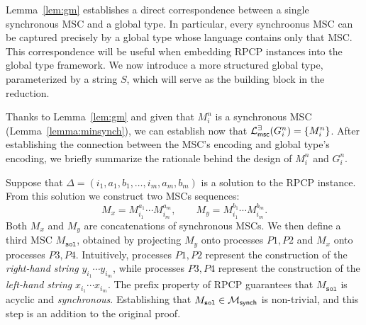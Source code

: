 Lemma~\ref{lem:gm} establishes a direct correspondence between a  
single synchronous MSC and a global type. In particular, every  
synchroonus MSC can be captured precisely by a global type whose  
language contains only that MSC. This correspondence will be useful  
when embedding RPCP instances into the global type framework.
We now introduce a more structured global type, parameterized by a  
string $S$, which will serve as the building block in the reduction.

Thanks to Lemma~\ref{lem:gm} and given that $M_i^n$
is a synchronous MSC (Lemma~\ref{lemma:minsynch}), 
we can establish now that 
$\mathcal{L}_{\mathsf{msc}}^{\exists}(G_i^n) =\{M_i^n\}$.
After establishing the connection between the MSC's encoding and
global type's encoding,
we briefly summarize the rationale behind the design of $M_i^n$ and $G_i^n$.

Suppose that $\Delta=(i_1,a_1,b_1,\ldots,i_m,a_m,b_m)$ is a  
solution to the RPCP instance. From this solution we construct   
two MSCs sequences:
\[
M_x = M^{a_1}_{i_1}\cdots M^{a_m}_{i_m}, \qquad  
M_y = M^{b_1}_{i_1}\cdots M^{b_m}_{i_m}.
\]
Both $M_x$ and $M_y$ are concatenations of synchronous  
MSCs. We then define a third MSC $M_{\texttt{sol}}$, obtained by  
projecting $M_y$ onto processes $P1,P2$ and $M_x$ onto processes  
$P3,P4$. Intuitively, processes $P1,P2$ represent the construction of  
the \emph{right-hand string} $y_{i_1}\cdots y_{i_m}$, while processes  
$P3,P4$ represent the construction of the \emph{left-hand string}  
$x_{i_1}\cdots x_{i_m}$. The prefix property of RPCP guarantees that  
$M_{\texttt{sol}}$ is acyclic and \emph{synchronous}. Establishing that 
$M_{\texttt{sol}} \in \mathcal{M}_{\mathsf{synch}}$ is non-trivial, and this 
step is an addition to the original proof. 





